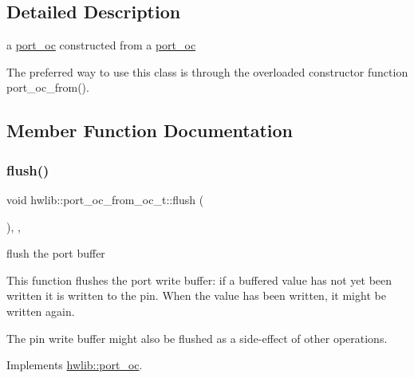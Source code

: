 \subsection{Detailed Description}
a \hyperlink{classhwlib_1_1port__oc}{port\+\_\+oc} constructed from a \hyperlink{classhwlib_1_1port__oc}{port\+\_\+oc}

The preferred way to use this class is through the overloaded constructor function port\+\_\+oc\+\_\+from(). 

\subsection{Member Function Documentation}
\mbox{\label{classhwlib_1_1port__oc__from__oc__t_aa6bb9eaa0ecb5305a5cbbdfe16887c07}} 
\subsubsection{\texorpdfstring{flush()}{flush()}}
{\footnotesize\ttfamily void hwlib\+::port\+\_\+oc\+\_\+from\+\_\+oc\+\_\+t\+::flush (\begin{DoxyParamCaption}{ }\end{DoxyParamCaption})\hspace{0.3cm}{\ttfamily [inline]}, {\ttfamily [override]}, {\ttfamily [virtual]}}





flush the port buffer

This function flushes the port write buffer\+: if a buffered value has not yet been written it is written to the pin. When the value has been written, it might be written again.

The pin write buffer might also be flushed as a side-\/effect of other operations. 

Implements \hyperlink{classhwlib_1_1port__oc_a49b64bd24431b35e92e208df84327dae}{hwlib\+::port\+\_\+oc}.

\mbox{\label{classhwlib_1_1port__oc__from__oc__t_a7836f8a9a50fb1311fb43b357cbe9310}} 
